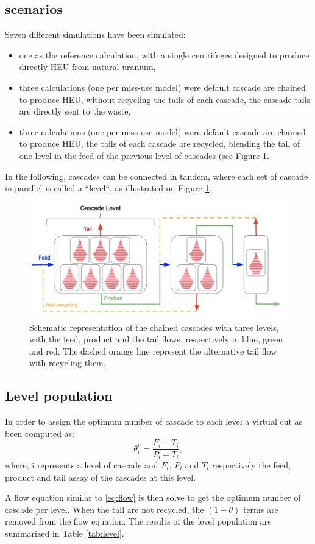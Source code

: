 \subsection{scenarios}
Seven different simulations have been simulated:
\begin{itemize}
\item one as the reference calculation, with a single centrifuges designed to
    produce directly \gls{HEU} from natural uranium,
\item three calculations (one per miss-use model) were default cascade are
    chained to produce \gls{HEU}, without recycling the tails of each cascade,
    the cascade tails are directly sent to the waste,
\item three calculations (one per miss-use model) were default cascade are
    chained to produce \gls{HEU}, the tails of each cascade are recycled, blending
    the tail of one level in the feed of the previous level of
    cascades (see Figure \ref{fig:cascade_level}.
\end{itemize}
In the following, cascades can be connected in tandem, where each set of cascade
in parallel is called a ``level``, as illustrated on Figure
\ref{fig:cascade_level}.

\begin{figure}[ht] %
    \centering
    \includegraphics[scale=0.45]{flow}
    \caption{Schematic representation of the chained cascades with three levels,
    with the feed, product and the tail flows, respectively in blue, green and
    red. The dashed orange line represent the alternative tail flow with
    recycling them.}
    \label{fig:cascade_level}
\end{figure}


\subsection{Level population}
In order to assign the optimum number of cascade to each level a virtual cut as
been computed as:
\begin{equation}
    \theta^{v}_{i} = \frac{F_{i}-T_{i}}{P_{i}-T_{i}},
\end{equation}
where, i represents a level of cascade and $F_{i}$, $P_{i}$ and $T_{i}$
respectively the feed, product and tail assay of the cascades at this level.

A flow equation similar to \eqref{eq:flow} is then solve to get the optimum
number of cascade per level. When the tail are not recycled, the $(1-\theta)$
terms are removed from the flow equation.  The results of the level population
are summarized in Table \ref{tab:level}.


